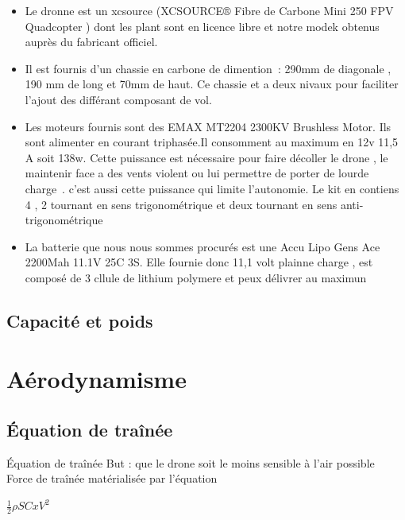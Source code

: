 \documentclass{beamer}
\begin{document}
\begin{frame}
  \begin{itemize}
    \item Le dronne est un xcsource (XCSOURCE® Fibre de Carbone Mini 250 FPV Quadcopter ) dont les plant sont en licence libre et notre modek obtenus auprès du fabricant officiel.

    \item Il est fournis d’un chassie en carbone de dimention : 290mm de diagonale , 190 mm de long et 70mm de haut. Ce chassie et a deux nivaux pour faciliter l’ajout des différant composant de vol.

    \item Les moteurs fournis sont des EMAX MT2204 2300KV Brushless Motor. Ils sont alimenter en courant triphasée.Il consomment au maximum en 12v  11,5 A soit 138w. Cette puissance est nécessaire pour faire décoller le drone , le maintenir face a des vents violent ou lui permettre de porter de lourde charge . c’est aussi cette puissance qui limite l’autonomie. Le kit en contiens 4 , 2 tournant en sens trigonométrique et deux tournant en sens anti-trigonométrique

    \item La batterie que nous nous sommes procurés est une Accu Lipo Gens Ace 2200Mah 11.1V 25C 3S. Elle fournie donc 11,1 volt  plainne charge , est composé de 3 cllule de lithium polymere et peux délivrer au maximun
  \end{itemize}
\end{frame}

\subsection{Capacité et poids}

\section{Aérodynamisme}

\subsection{Équation de traînée}
\begin{frame}{Équation de traînée}
 But : que le drone soit le moins sensible à l'air possible \\
 Force de traînée matérialisée par l'équation \\
 \begin{center}
  $\displaystyle{\frac12 \rho S Cx V^2}$
 \end{center}
\end{frame}
\end{document}
